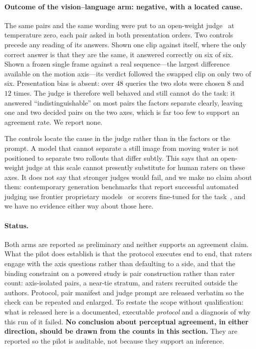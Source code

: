 \documentclass[10pt,twocolumn,letterpaper]{article}
\begin{document}
\paragraph{Outcome of the vision--language arm: negative, with a located cause.}
The same pairs and the same wording were put to an open-weight
judge~\cite{qwen3vl2025} at temperature zero, each pair asked in both
presentation orders. Two controls precede any reading of its answers. Shown one
clip against itself, where the only correct answer is that they are the same, it
answered correctly on six of six. Shown a frozen single frame against a real
sequence---the largest difference available on the motion axis---its verdict
followed the swapped clip on only two of six. Presentation bias is absent: over
$48$ queries the two slots were chosen $8$ and $12$ times. The judge is
therefore well behaved and still cannot do the task: it answered
``indistinguishable'' on most pairs the factors separate clearly, leaving one
and two decided pairs on the two axes, which is far too few to support an
agreement rate. We report none.

The controls locate the cause in the judge rather than in the factors or the
prompt. A model that cannot separate a still image from moving water is not
positioned to separate two rollouts that differ subtly. This says that an
open-weight judge at this scale cannot presently substitute for human raters on
these axes. It does not say that stronger judges would fail, and we make no
claim about them: contemporary generation benchmarks that report successful
automated judging use frontier proprietary
models~\cite{han2025videobench,sun2024t2v_compbench} or scorers fine-tuned for
the task~\cite{he2024videoscore}, and we have no evidence either way about those
here.

\paragraph{Status.}
Both arms are reported as preliminary and neither supports an agreement claim.
What the pilot does establish is that the protocol executes end to end, that
raters engage with the axis questions rather than defaulting to a side, and
that the binding constraint on a powered study is pair construction rather than
rater count: axis-isolated pairs, a near-tie stratum, and raters recruited
outside the authors. Protocol, pair manifest and judge prompt are released
verbatim so the check can be repeated and enlarged. To restate the scope
without qualification: what is released here is a documented, executable \emph{protocol}
and a diagnosis of why this run of it failed. \textbf{No conclusion about
perceptual agreement, in either direction, should be drawn from the counts in
this section.} They are reported so the pilot is auditable, not because they
support an inference.
\end{document}
